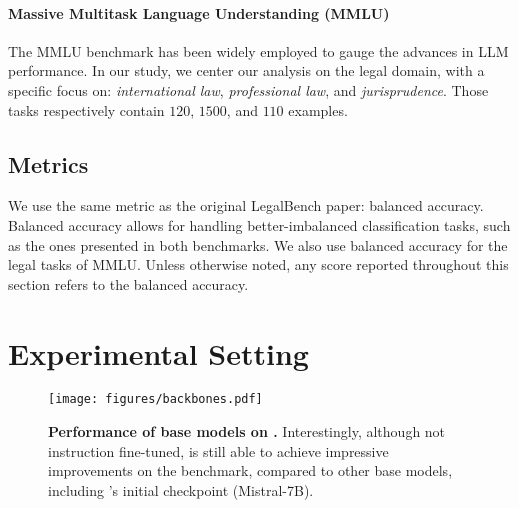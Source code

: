 \paragraph{Massive Multitask Language Understanding (MMLU)} The MMLU benchmark \citep{hendrycks2020measuring} has been widely employed to gauge the advances in LLM performance. In our study, we center our analysis on the legal domain, with a specific focus on:
\textit{international law}, \textit{professional law}, and \textit{jurisprudence}. Those tasks respectively contain $120$, $1500$, and $110$ examples.

\iffalse
 \paragraph{Benchmark:} We present results on two legal benchmarks: \legalbench{} already presented in \autoref{sec:legal_bench_instruct}, comprising 165 legal tasks, with each task comprising from merely 50 to more than 10'000 samples. We refer to the original paper \cite{guha2023legalbench} for detailed statistics. To confirm findings, we also evaluate models on three legal tasks from the \textit{Massive Multitask Language Understanding} (MMLU) benchmark \cite{hendrycks2020measuring}: 
\textit{international law}, \textit{professional law} and \textit{jurisprudence}. Those tasks respectively contain 120, 1500, and 110 samples. We coin this benchmark \legalmmlu{}.
\fi 

\subsection{Metrics}
We use the same metric as the original LegalBench \cite{guha2023legalbench} paper: balanced accuracy. Balanced accuracy allows for handling better-imbalanced classification tasks, such as the ones presented in both benchmarks. We also use balanced accuracy for the legal tasks of MMLU. Unless otherwise noted, any score reported throughout this section refers to the balanced accuracy.

\section{Experimental Setting}
\begin{figure}
    \centering
    \texttt{[image: figures/backbones.pdf]}
    \caption{\textbf{Performance of base models on \legalbench{}.} Interestingly, although not instruction fine-tuned, \ourmodel{} is still able to achieve impressive improvements on the benchmark, compared to other base models, including \ourmodel's initial checkpoint (Mistral-7B).}
    \label{fig:raw_backbones}
\end{figure}
